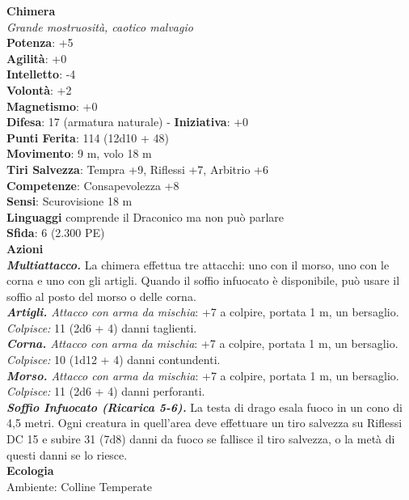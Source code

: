\begin{multicols}{2}
\medskip\textbf{Chimera}\\
\emph{Grande mostruosità, caotico malvagio}\\
\textbf{Potenza}: +5\\
\textbf{Agilità}: +0\\
\textbf{Intelletto}: -4\\
\textbf{Volontà}: +2\\
\textbf{Magnetismo}: +0\\
\textbf{Difesa}: 17 (armatura naturale) - \textbf{Iniziativa}: +0\\
\textbf{Punti Ferita}: 114 (12d10 + 48)\\
\textbf{Movimento}: 9 m, volo 18 m\\
\textbf{Tiri Salvezza}: Tempra +9, Riflessi +7, Arbitrio +6\\
\textbf{Competenze}: Consapevolezza +8\\
\textbf{Sensi}: Scurovisione 18 m\\
\textbf{Linguaggi} comprende il Draconico ma non può parlare\\
\textbf{Sfida}: 6 (2.300 PE)\smallskip\\
\smallskip\textbf{Azioni}\\
\emph{\textbf{Multiattacco.}} La chimera effettua tre attacchi: uno con il morso, uno con le corna e uno con gli artigli. Quando il soffio infuocato è disponibile, può usare il soffio al posto del morso o delle corna.\\
\emph{\textbf{Artigli.} Attacco con arma da mischia}: +7 a colpire, portata 1 m, un bersaglio. \\
\emph{Colpisce:} 11 (2d6 + 4) danni taglienti.\\
\emph{\textbf{Corna.} Attacco con arma da mischia}: +7 a colpire, portata 1 m, un bersaglio.\\
\emph{Colpisce:} 10 (1d12 + 4) danni contundenti.\\
\emph{\textbf{Morso.} Attacco con arma da mischia}: +7 a colpire, portata 1 m, un bersaglio.\\
\emph{Colpisce:} 11 (2d6 + 4) danni perforanti.\\
\emph{\textbf{Soffio Infuocato (Ricarica 5-6).}} La testa di drago esala fuoco in un cono di 4,5 metri. Ogni creatura in quell'area deve effettuare un tiro salvezza su Riflessi DC 15 e subire 31 (7d8) danni da fuoco se fallisce il tiro salvezza, o la metà di questi danni se lo riesce.\\
\textbf{Ecologia}\\
Ambiente: Colline Temperate\\

\end{multicols}

